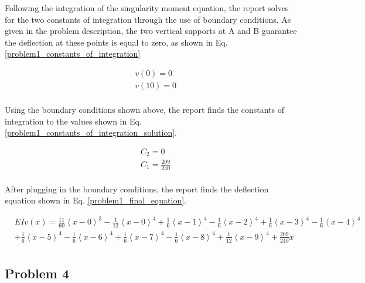\documentclass[a4paper]{article}
\begin{document}
Following the integration of the singularity moment equation, the report solves for the two constants of integration through the use of boundary conditions. As given in the problem description, the two vertical supports at A and B guarantee the deflection at these points is equal to zero, as shown in Eq. \ref{problem1_constants_of_integration}

\begin{equation}
\begin{split}
	& v(0) = 0 \\
	& v(10) = 0 \\
\end{split}
\label{problem1_constants_of_integration}
\end{equation}

Using the boundary conditions shown above, the report finds the constants of integration to the values shown in Eq. \ref{problem1_constants_of_integration_solution}.

\begin{equation}
\begin{split}
	& C_2 = 0 \\
	& C_1 = \frac{209}{240} \\
\end{split}
\label{problem1_constants_of_integration_solution}
\end{equation}

After plugging in the boundary conditions, the report finds the deflection equation shown in Eq. \ref{problem1_final_equation}.

\begin{equation}
\begin{split}
  & EI v(x) = \frac{11}{60}\left<x-0\right>^3 - \frac{1}{12}\left<x-0\right>^4 +  \frac{1}{6}\left<x-1\right>^4 - \frac{1}{6}\left<x-2\right>^4 + \frac{1}{6}\left<x-3\right>^4 - \frac{1}{6}\left<x-4\right>^4 \\  	  
&   +  \frac{1}{6}\left<x-5\right>^4 - \frac{1}{6}\left<x-6\right>^4  +  \frac{1}{6}\left<x-7\right>^4 - \frac{1}{6}\left<x-8\right>^4 +  \frac{1}{12}\left<x-9\right>^4 + \frac{209}{240}x\\
\end{split}
\label{problem1_final_equation}
\end{equation}

\subsection{Problem 4}
\end{document}
